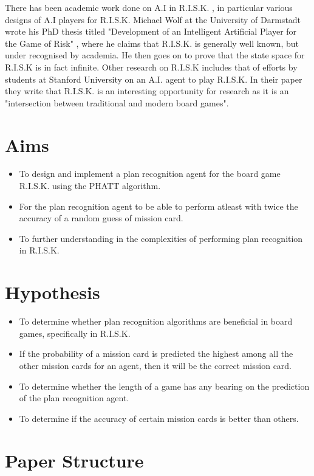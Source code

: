 \documentclass[parskip]{cs4rep}
\begin{document}
There has been academic work done on A.I in R.I.S.K. , in particular various designs of A.I players for R.I.S.K. Michael Wolf at the University of Darmstadt wrote his PhD thesis titled "Development of an Intelligent Artificial Player for the Game of Risk" \cite{michaelwolf}, where he claims that R.I.S.K. is generally well known, but under recognised by academia. He then goes on to prove that the state space for R.I.S.K is in fact infinite. Other research on R.I.S.K includes that of efforts by students at Stanford University on an A.I. \cite{jlozanodbratz} agent to play R.I.S.K. In their paper they write that R.I.S.K. is an interesting opportunity for research as it is an "intersection between traditional and modern board games".

\section{Aims}

\begin{itemize}
\item
To design and implement a plan recognition agent for the board game R.I.S.K. using the PHATT algorithm.
\item
For the plan recognition agent to be able to perform atleast with twice the accuracy of a random guess of mission card.
\item
To further understanding in the complexities of performing plan recognition in R.I.S.K.
\end{itemize}

\section{Hypothesis}

\begin{itemize}
\item
To determine whether plan recognition algorithms are beneficial in board games, specifically in R.I.S.K.
\item
If the probability of a mission card is predicted the highest among all the other mission cards for an agent, then it will be the correct mission card.
\item
To determine whether the length of a game has any bearing on the prediction of the plan recognition agent.
\item
To determine if the accuracy of certain mission cards is better than others.
\end{itemize}

\section{Paper Structure}
\end{document}
